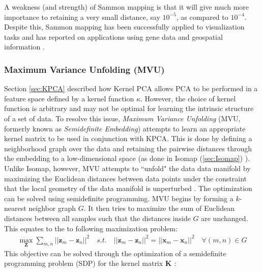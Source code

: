 A weakness (and strength) of Sammon mapping is that it will give much more importance to retaining a very small distance, say $10^{-5}$, as compared to  $10^{-4}$.  Despite this, Sammon mapping has been successfully applied to visualization tasks and has reported on applications using gene data and geospatial information \citep{VanDerMaaten2009DRReview}.

\subsubsection{Maximum Variance Unfolding (MVU)} \label{sec:MVU}
Section \ref{sec:KPCA} described how Kernel PCA \citep{Scholkopf1999KPCA,Wang2014KPCAReview} allows PCA to be performed in a feature space defined by a kernel function $\kappa$.  However, the choice of kernel function is arbitrary and may not be optimal for learning the intrinsic structure of a set of data.  To resolve this issue, \textit{Maximum Variance Unfolding} (MVU, formerly known as \textit{Semidefinite Embedding}) attempts to learn an appropriate kernel matrix \citep{Weinberger2004MVU} to be used in conjunction with KPCA.  This is done by defining a neighborhood graph over the data and retaining the pairwise distances through the embedding to a low-dimensional space (as done in Isomap (\ref{sec:Isomap}) \citep{Tenenbaum2000Isomap}).  Unlike Isomap, however, MVU attempts to ``unfold" the data data manifold by maximizing the Euclidean distances between data points under the constraint that the local geometry of the data manifold is unperturbed \citep{VanDerMaaten2009DRReview}.  The optimization can be solved using semidefinite programming.  MVU begins by forming a $k$-nearest neighbor graph $G$.  It then tries to maximize the sum of Euclidean distances between all samples such that the distances inside $G$ are unchanged.  This equates to the to following maximization problem:
\begin{align}
	\max_{\bm{Z}} \sum_{m,n} ||\bm{z}_{m} - \bm{z}_{n} ||^{2} \quad s.t. \quad ||\bm{z}_{m} - \bm{z}_{n} ||^{2} = ||\bm{x}_{m} - \bm{x}_{n} ||^{2} \quad \forall (m,n) \in G
\end{align}
\noindent
This objective can be solved through the optimization of a semidefinite programming problem (SDP) for the kernel matrix $\bm{K}$ \citep{Weinberger2004MVU}:

